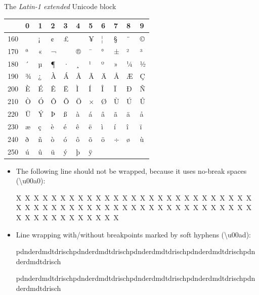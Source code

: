 \documentclass[a4paper]{memoir}
\newlength{\DUtablewidth} %
\providecommand*{\DUroletitlereference}[1]{\textsl{#1}}
\begin{document}
The \DUroletitlereference{Latin-1 extended} Unicode block

\setlength{\DUtablewidth}{\linewidth}%
\begin{longtable*}{|p{0.051\DUtablewidth}|p{0.028\DUtablewidth}|p{0.028\DUtablewidth}|p{0.028\DUtablewidth}|p{0.028\DUtablewidth}|p{0.028\DUtablewidth}|p{0.028\DUtablewidth}|p{0.028\DUtablewidth}|p{0.028\DUtablewidth}|p{0.028\DUtablewidth}|p{0.028\DUtablewidth}|}
\hline

% 
 & 
0
 & 
1
 & 
2
 & 
3
 & 
4
 & 
5
 & 
6
 & 
7
 & 
8
 & 
9
 \\
\hline

160
 &  & 
¡
 & 
¢
 & 
£
 &  & 
¥
 & 
¦
 & 
§
 & 
¨
 & 
©
 \\
\hline

170
 & 
ª
 & 
«
 & 
¬
 & 
\-
 & 
®
 & 
¯
 & 
°
 & 
±
 & 
²
 & 
³
 \\
\hline

180
 & 
´
 & 
µ
 & 
¶
 & 
·
 & 
¸
 & 
¹
 & 
º
 & 
»
 & 
¼
 & 
½
 \\
\hline

190
 & 
¾
 & 
¿
 & 
À
 & 
Á
 & 
Â
 & 
Ã
 & 
Ä
 & 
Å
 & 
Æ
 & 
Ç
 \\
\hline

200
 & 
È
 & 
É
 & 
Ê
 & 
Ë
 & 
Ì
 & 
Í
 & 
Î
 & 
Ï
 & 
Ð
 & 
Ñ
 \\
\hline

210
 & 
Ò
 & 
Ó
 & 
Ô
 & 
Õ
 & 
Ö
 & 
×
 & 
Ø
 & 
Ù
 & 
Ú
 & 
Û
 \\
\hline

220
 & 
Ü
 & 
Ý
 & 
Þ
 & 
ß
 & 
à
 & 
á
 & 
â
 & 
ã
 & 
ä
 & 
å
 \\
\hline

230
 & 
æ
 & 
ç
 & 
è
 & 
é
 & 
ê
 & 
ë
 & 
ì
 & 
í
 & 
î
 & 
ï
 \\
\hline

240
 & 
ð
 & 
ñ
 & 
ò
 & 
ó
 & 
ô
 & 
õ
 & 
ö
 & 
÷
 & 
ø
 & 
ù
 \\
\hline

250
 & 
ú
 & 
û
 & 
ü
 & 
ý
 & 
þ
 & 
ÿ
 &  &  &  &  \\
\hline
\end{longtable*}

\begin{itemize}
\item The following line should not be wrapped, because it uses
no-break spaces (\textbackslash{}u00a0):

X X X X X X X X X X X X X X X X X X X X X X X X X X X X X X X X X X X X X X X X X X X X X X X X X X X X X X X X X X X X X X X X X X

\item Line wrapping with/without breakpoints marked by soft hyphens
(\textbackslash{}u00ad):

pdn\-derd\-mdtd\-ri\-schpdn\-derd\-mdtd\-ri\-schpdn\-derd\-mdtd\-ri\-schpdn\-derd\-mdtd\-ri\-schpdn\-derd\-mdtd\-ri\-sch

pdnderdmdtdrischpdnderdmdtdrischpdnderdmdtdrischpdnderdmdtdrischpdnderdmdtdrisch
\end{itemize}
\end{document}
